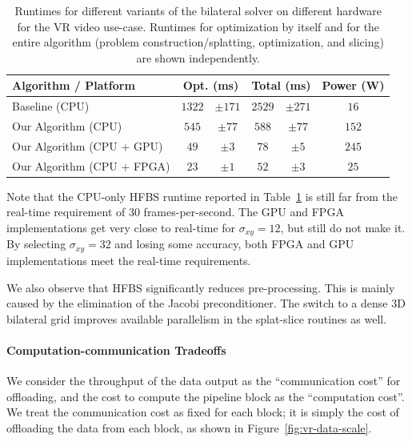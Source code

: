 \begin{table}[h]
\centering
\caption{Runtimes for different variants of the bilateral solver on different hardware for the VR video use-case. Runtimes for optimization by itself and for the entire algorithm (problem construction/splatting, optimization, and slicing) are shown independently.}


\begin{tabular}{@{}lc@{}cc@{}cc}
\toprule
Algorithm / Platform & \multicolumn{2}{c}{Opt. (ms) } & \multicolumn{2}{c}{Total (ms)} & Power (W) \\ \midrule
 Baseline (CPU) & $1322$ & $\pm 171$ & $2529$ & $\pm 271$ & $16$ \\
                               Our Algorithm (CPU) & $545$ & $\pm 77$ & $588$ & $\pm 77$ & $152$ \\
                         Our Algorithm (CPU + GPU) & $49$ & $\pm 3$ & $78$ & $\pm 5$ & $245$ \\
                        Our Algorithm (CPU + FPGA) & $23$ & $\pm 1$ & $52$ & $\pm 3$ & $25$ \\
\bottomrule
\end{tabular}

\label{table:jump_runtimes}

\end{table}

Note that the CPU-only HFBS runtime reported in Table~\ref{table:jump_runtimes} is still far from the real-time requirement of 30 frames-per-second. The GPU and FPGA implementations get very close to real-time for $\sigma_{xy} = 12$, but still do not make it.
By selecting $\sigma_{xy} = 32$ and losing some accuracy, both FPGA and GPU implementations meet the real-time requirements.

We also observe that HFBS significantly reduces pre-processing. This is mainly caused by the elimination of the Jacobi preconditioner. The switch to a dense 3D bilateral grid improves available parallelism in the splat-slice routines as well.


\paragraph{Computation-communication Tradeoffs}

We consider the throughput of the data output as the ``communication cost'' for offloading, and the cost to compute the pipeline block as the ``computation cost''. We treat the communication cost as fixed for each block; it is simply the cost of offloading the data from each block, as shown in Figure~\ref{fig:vr-data-scale}.

